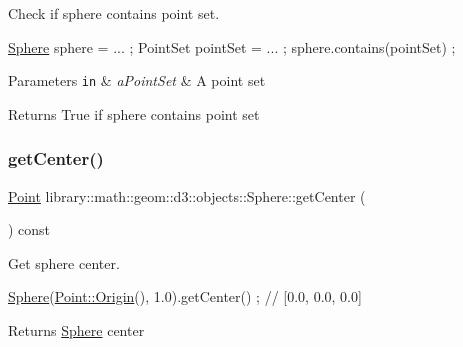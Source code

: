 Check if sphere contains point set. 


\begin{DoxyCode}
\hyperlink{classlibrary_1_1math_1_1geom_1_1d3_1_1objects_1_1_sphere_a55dccc8ea16ee55cd7694c26afa8ea39}{Sphere} sphere = ... ;
PointSet pointSet = ... ;
sphere.contains(pointSet) ;
\end{DoxyCode}



\begin{DoxyParams}[1]{Parameters}
\mbox{\tt in}  & {\em a\+Point\+Set} & A point set \\
\hline
\end{DoxyParams}
\begin{DoxyReturn}{Returns}
True if sphere contains point set 
\end{DoxyReturn}
\mbox{\label{classlibrary_1_1math_1_1geom_1_1d3_1_1objects_1_1_sphere_a871367ab75aa46194a6b8ddc8a45967f}} 
\subsubsection{\texorpdfstring{get\+Center()}{getCenter()}}
{\footnotesize\ttfamily \hyperlink{classlibrary_1_1math_1_1geom_1_1d3_1_1objects_1_1_point}{Point} library\+::math\+::geom\+::d3\+::objects\+::\+Sphere\+::get\+Center (\begin{DoxyParamCaption}{ }\end{DoxyParamCaption}) const}



Get sphere center. 


\begin{DoxyCode}
\hyperlink{classlibrary_1_1math_1_1geom_1_1d3_1_1objects_1_1_sphere_a55dccc8ea16ee55cd7694c26afa8ea39}{Sphere}(\hyperlink{classlibrary_1_1math_1_1geom_1_1d3_1_1objects_1_1_point_ab2a38e285c562e50bf350272c083986f}{Point::Origin}(), 1.0).getCenter() ; \textcolor{comment}{// [0.0, 0.0, 0.0]}
\end{DoxyCode}


\begin{DoxyReturn}{Returns}
\hyperlink{classlibrary_1_1math_1_1geom_1_1d3_1_1objects_1_1_sphere}{Sphere} center 
\end{DoxyReturn}
\mbox{\label{classlibrary_1_1math_1_1geom_1_1d3_1_1objects_1_1_sphere_a48cfc72b6eec9a953fb837a13e1df45e}} 
